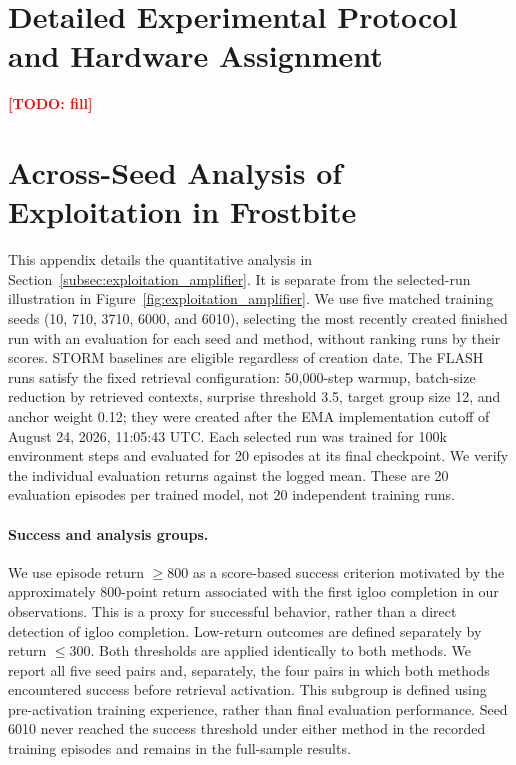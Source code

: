 \documentclass{article} %
\newcommand{\todo}[1]{\textcolor{red}{\textbf{[TODO: #1]}}}
\begin{document}
\appendix

\section{Detailed Experimental Protocol and Hardware Assignment}
\label{app:experimental_protocol}

\todo{fill}

\section{Across-Seed Analysis of Exploitation in Frostbite}
\label{sec:appendix_exploitation}

This appendix details the quantitative analysis in Section~\ref{subsec:exploitation_amplifier}. It is separate from the selected-run illustration in Figure~\ref{fig:exploitation_amplifier}. We use five matched training seeds (10, 710, 3710, 6000, and 6010), selecting the most recently created finished run with an evaluation for each seed and method, without ranking runs by their scores. STORM baselines are eligible regardless of creation date. The FLASH runs satisfy the fixed retrieval configuration: 50,000-step warmup, batch-size reduction by retrieved contexts, surprise threshold 3.5, target group size 12, and anchor weight 0.12; they were created after the EMA implementation cutoff of August 24, 2026, 11:05:43 UTC. Each selected run was trained for 100k environment steps and evaluated for 20 episodes at its final checkpoint. We verify the individual evaluation returns against the logged mean. These are 20 evaluation episodes per trained model, not 20 independent training runs.

\paragraph{Success and analysis groups.}
We use episode return $\geq 800$ as a score-based success criterion motivated by the approximately 800-point return associated with the first igloo completion in our observations. This is a proxy for successful behavior, rather than a direct detection of igloo completion. Low-return outcomes are defined separately by return $\leq 300$. Both thresholds are applied identically to both methods. We report all five seed pairs and, separately, the four pairs in which both methods encountered success before retrieval activation. This subgroup is defined using pre-activation training experience, rather than final evaluation performance. Seed 6010 never reached the success threshold under either method in the recorded training episodes and remains in the full-sample results.
\end{document}
